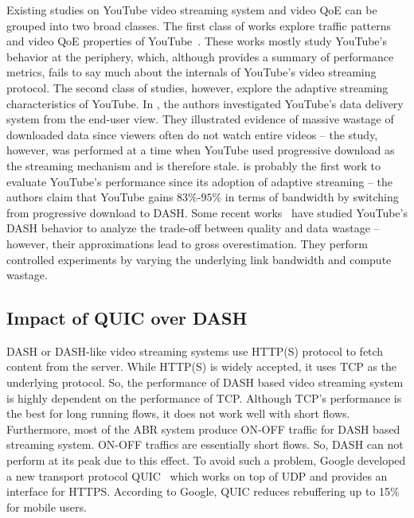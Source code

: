 Existing studies on YouTube video streaming system and video QoE can be grouped into two broad classes. The first class of works explore traffic patterns and video QoE properties of YouTube~\cite{gill2007youtube,krishnappa2013dashing,wamser2016modeling,wamser2015poster,6757893ieeeexp,7129790ieeeexp}. These works mostly study YouTube's behavior at the periphery, which, although provides a summary of performance metrics, fails to say much about the internals of YouTube's video streaming protocol. The second class of studies, however, explore the adaptive streaming characteristics of YouTube. In \cite{finamore2011youtube}, the authors investigated YouTube's data delivery system from the end-user view. They illustrated evidence of massive wastage of downloaded data since viewers often do not watch entire videos -- the study, however, was performed at a time when YouTube used progressive download as the streaming mechanism and is therefore stale. \cite{krishnappa2013dashing} is probably the first work to evaluate YouTube's performance since its adoption of adaptive streaming -- the authors claim that YouTube gains $83\%$-$95\%$ in terms of bandwidth by switching from progressive download to DASH. Some recent works~\cite{sieber2015cost,seufert2015youtube,sieber2016sacrificing} have studied YouTube's DASH behavior to analyze the trade-off between quality and data wastage -- however, their approximations lead to gross overestimation. They perform controlled experiments by varying the underlying link bandwidth and compute wastage.

\subsection{Impact of QUIC over DASH}
DASH or DASH-like video streaming systems use HTTP(S) protocol to fetch content from the server. While HTTP(S) is widely accepted, it uses TCP as the underlying protocol. So, the performance of DASH based video streaming system is highly dependent on the performance of TCP. Although TCP's performance is the best for long running flows, it does not work well with short flows. Furthermore, most of the ABR system produce ON-OFF traffic for DASH based streaming system. ON-OFF traffics are essentially short flows. So, DASH can not perform at its peak due to this effect. To avoid such a problem, Google developed a new transport protocol QUIC~\cite{langley2017quic} which works on top of UDP and provides an interface for HTTPS. According to Google, QUIC reduces rebuffering up to 15\% for mobile users.

